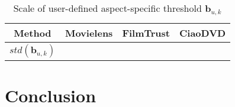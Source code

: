 \documentclass[letterpaper]{article} %
\begin{document}
\begin{table}[htp]
\caption{Scale of user-defined aspect-specific threshold $\mathbf{b}_{u,k}$}
\begin{center}
\begin{tabular}{|c|c|c|c|}
\hline
Method & Movielens & FilmTrust & CiaoDVD \\\hline
$std(\mathbf{b}_{u,k})$ & & & \\\hline
\end{tabular}
\end{center}
\label{tab:bias}
\end{table}%



\section{Conclusion}\label{sec:conclusion}




\end{document}
